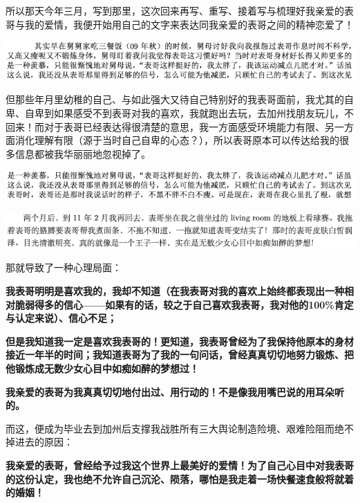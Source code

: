 \documentclass[9pt, b5paper]{article}
\begin{document}
所以那天今年三月，写到那里，这次回来再写、重写、接着写与梳理好我亲爱的表哥与我的爱情，我便开始用自己的文字来表达同我亲爱的表哥之间的精神恋爱了！

\begin{center}
\includegraphics[width=.9\linewidth]{./pic/backups_plans_20210426_162643.png}
\end{center}

但那些年月里幼稚的自己、与如此强大又待自己特别好的我表哥面前，我尤其的自卑、自卑到如果感受不到表哥对我的喜欢，我就跑出去玩，去加州找朋友玩儿，不回来！而对于表哥已经表达得很清楚的意思，我一方面感受环境能力有限、另一方面消化理解有限（源于当时自己自卑的心态？），所以表哥原本可以传达给我的很多信息都被我华丽丽地忽视掉了。

\begin{center}
\includegraphics[width=.9\linewidth]{./pic/backups_plans_20210426_163310.png}
\end{center}

\begin{center}
\includegraphics[width=.9\linewidth]{./pic/backups_plans_20210426_163417.png}
\end{center}

那就导致了一种心理局面：

\textbf{我表哥明明是喜欢我的，我却不知道（在我表哥对我的喜欢上始终都表现出一种相对脆弱得多的信心——如果有的话，较之于自己喜欢我表哥，我对他的100\%肯定与认定来说）、信心不足；}

\textbf{但是我知道我一定是喜欢我表哥的！更知道，我表哥曾经为了我保持他原本的身材接近一年半的时间；我知道表哥为了我的一句问话，曾经真真切切地努力锻炼、把他锻炼成无数少女心目中如痴如醉的梦想过！}

\textbf{我亲爱的表哥为我真真切切地付出过、用行动的！不是像我用嘴巴说的用耳朵听的。}

而这，便成为毕业去到加州后支撑我战胜所有三大舆论制造险境、艰难险阻而绝不掉进去的原因：

\textbf{我亲爱的表哥，曾经给予过我这个世界上最美好的爱情！为了自己心目中对我表哥的这份认定，我也绝不允许自己沉沦、陨落，哪怕是我走着一场快餐速食般将就着的婚姻！}
\end{document}
